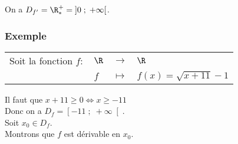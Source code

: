 \vspace*{.3cm}

On a $D_{f'} = \R^+_* = \left]0 \; ; \; +\infty\right[$.

\newpage

\vspace*{-2cm}

\subsubsection{Exemple }

\begin{tabular}{llll}
Soit la fonction $f :$ & $\R$ & $\longrightarrow$ & $\R$ \\
& $f$ & $\longmapsto$ & $f(x) = \sqrt{x + 11} - 1 $ \\
\end{tabular}

Il faut que $x+ 11 \geqslant 0 \Longleftrightarrow x \geqslant -11$ \\

Donc on a $D_f = \left[-11 \; ; \; +\infty\right[$. \\

Soit $x_0 \in D_f$. \\

Montrons que $f$ est dérivable en $x_0$. \\

